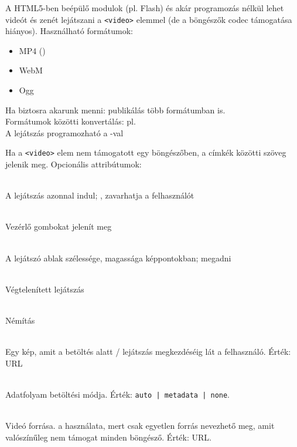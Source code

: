 \begin{frame}
  A HTML5-ben beépülő modulok (pl. Flash) és akár programozás nélkül 
  lehet videót és zenét lejátszani a \texttt{<video>} elemmel (de a böngészők codec 
  támogatása hiányos). Használható formátumok:
  \begin{itemize}
    \item MP4 ()
    \item WebM
    \item Ogg
  \end{itemize}
  Ha biztosra akarunk menni: publikálás több formátumban is.\\
  Formátumok közötti konvertálás: pl. 
  \\
  A lejátszás programozható a -val\\
\end{frame}

\begin{frame}
  Ha a \texttt{<video>} elem nem támogatott egy böngészőben, a 
  címkék közötti szöveg jelenik meg. Opcionális attribútumok:
  \begin{description}[m]
    \item[\texttt{<autoplay>}] \hfill \\ A lejátszás azonnal indul; 
    , zavarhatja a felhasználót
    \item[\texttt{<controls>}] \hfill \\ Vezérlő gombokat jelenít meg
    \item[\texttt{<width>}, \texttt{<height>}] \hfill \\ A lejátszó 
    ablak szélessége, magassága képpontokban;  megadni
    \item[\texttt{<loop>}] \hfill \\ Végtelenített lejátszás
  \end{description}
\end{frame}

\begin{frame}
  \begin{description}[m]
    \item[\texttt{<muted>}] \hfill \\ Némítás
    \item[\texttt{<poster>}] \hfill \\ Egy kép, amit a betöltés 
    alatt / lejátszás megkezdéséig lát a felhasználó. Érték: URL
    \item[\texttt{<preload>}] \hfill \\ Adatfolyam betöltési módja. 
    Érték: \texttt{auto | metadata | none}.
    \item[\texttt{<src>}] \hfill \\ Videó forrása.  a használata, mert csak egyetlen forrás nevezhető meg, 
    amit valószínűleg nem támogat minden böngésző. Érték: URL.
  \end{description}
\end{frame}

